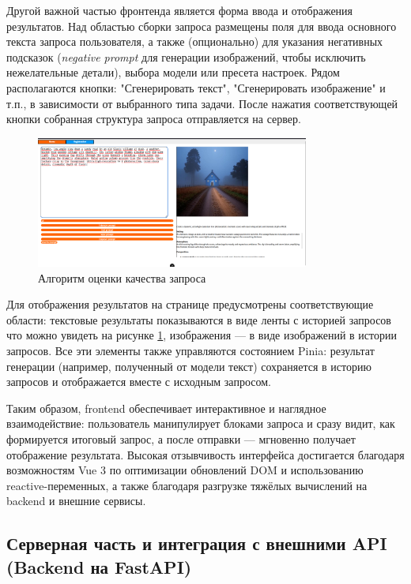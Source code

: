 Другой важной частью фронтенда является форма ввода и отображения результатов. Над областью сборки запроса размещены поля для ввода основного текста запроса пользователя, а также (опционально) для указания негативных подсказок (\textit{negative prompt} для генерации изображений, чтобы исключить нежелательные детали), выбора модели или пресета настроек. Рядом располагаются кнопки: "Сгенерировать текст", "Сгенерировать изображение" и т.п., в зависимости от выбранного типа задачи. После нажатия соответствующей кнопки собранная структура запроса отправляется на сервер.
\begin{figure}[htbp]
    \centering
    \includegraphics[width=0.8\textwidth]{picture/interface-screenshot_1.png}
    \caption{Алгоритм оценки качества запроса}\label{interface-screenshot}
\end{figure}
Для отображения результатов на странице предусмотрены соответствующие области: текстовые результаты показываются в виде ленты с историей запросов что можно увидеть на рисунке \ref{interface-screenshot}, изображения — в виде изображений в истории запросов. Все эти элементы также управляются состоянием Pinia: результат генерации (например, полученный от модели текст) сохраняется в историю запросов и отображается вместе с исходным запросом.

Таким образом, frontend обеспечивает интерактивное и наглядное взаимодействие: пользователь манипулирует блоками запроса и сразу видит, как формируется итоговый запрос, а после отправки — мгновенно получает отображение результата. Высокая отзывчивость интерфейса достигается благодаря возможностям Vue 3 по оптимизации обновлений DOM и использованию reactive-переменных, а также благодаря разгрузке тяжёлых вычислений на backend и внешние сервисы.

\subsection{Серверная часть и интеграция с внешними API (Backend на FastAPI)}

